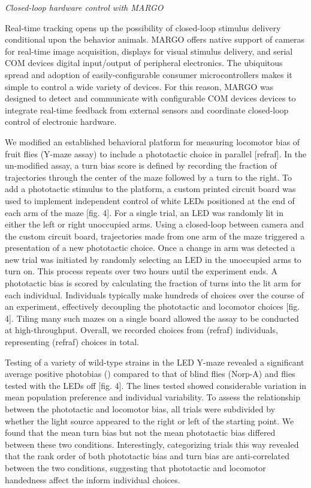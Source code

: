 \documentclass[10pt]{article}
\begin{document}
\begin{multicols}{2}
\textit{Closed-loop hardware control with MARGO}

Real-time tracking opens up the possibility of closed-loop stimulus delivery conditional upon the behavior animals. MARGO offers native support of cameras for real-time image acquisition, displays for visual stimulus delivery, and serial COM devices digital input/output of peripheral electronics. The ubiquitous spread and adoption of easily-configurable consumer microcontrollers makes it simple to control a wide variety of devices. For this reason, MARGO was designed to detect and communicate with configurable COM devices devices to integrate real-time feedback from external sensors and coordinate closed-loop control of electronic hardware.

We modified an established behavioral platform for measuring locomotor bias of fruit flies (Y-maze assay) to include a phototactic choice in parallel [refraf]. In the un-modified assay, a turn bias score is defined by recording the fraction of trajectories through the center of the maze followed by a turn to the right. To add a phototactic stimulus to the platform, a custom printed circuit board was used to implement independent control of white LEDs positioned at the end of each arm of the maze [fig. 4]. For a single trial, an LED was randomly lit in either the left or right unoccupied arms. Using a closed-loop between camera and the custom circuit board, trajectories made from one arm of the maze triggered a presentation of a new phototactic choice. Once a change in arm was detected a new trial was initiated by randomly selecting an LED in the unoccupied arms to turn on. This process repeats over two hours until the experiment ends. A phototactic bias is scored by calculating the fraction of turns into the lit arm for each individual. Individuals typically make hundreds of choices over the course of an experiment, effectively decoupling the phototactic and locomotor choices [fig. 4]. Tiling many such mazes on a single board allowed the assay to be conducted at high-throughput. Overall, we recorded choices from (refraf) individuals, representing (refraf) choices in total.

Testing of a variety of wild-type strains in the LED Y-maze revealed a significant average positive photobias () compared to that of blind flies (Norp-A) and flies tested with the LEDs off [fig. 4]. The lines tested showed considerable variation in mean population preference and individual variability. To assess the relationship between the phototactic and locomotor bias, all trials were subdivided by whether the light source appeared to the right or left of the starting point. We found that the mean turn bias but not the mean phototactic bias differed between these two conditions. Interestingly, categorizing trials this way revealed that the rank order of both phototactic bias and turn bias are anti-correlated between the two conditions, suggesting that phototactic and locomotor handedness affect the inform individual choices. 


\end{multicols}
\end{document}
